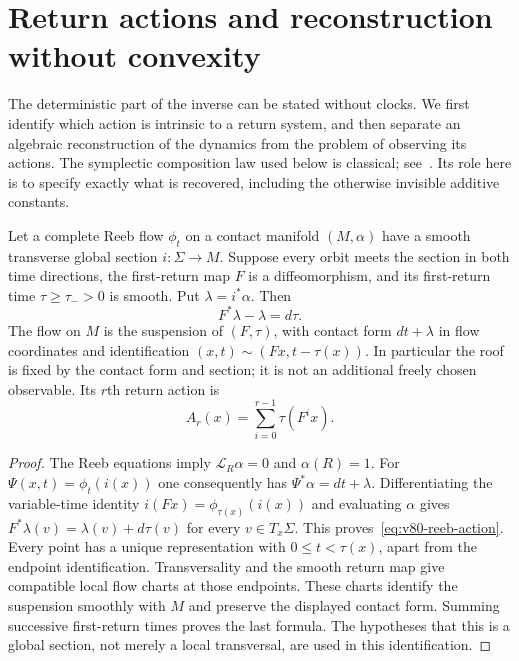\section{Return actions and reconstruction without convexity}
\label{sec:v80-intrinsic}

The deterministic part of the inverse can be stated without clocks.
We first identify which action is intrinsic to a return system, and then
separate an algebraic reconstruction of the dynamics from the problem
of observing its actions.  The symplectic composition law used below is
classical; see~\cite{MarsdenWest2001,LallWest2006}.  Its role here is to
specify exactly what is recovered, including the otherwise invisible
additive constants.

\begin{proposition}
\label{prop:v80-reeb}
Let a complete Reeb flow $\phi_t$ on a contact manifold $(M,\alpha)$
have a smooth transverse global section $i:\Sigma\to M$.  Suppose every
orbit meets the section in both time directions, the first-return map
$F$ is a diffeomorphism, and its first-return time $\tau\ge\tau_->0$ is smooth.
Put $\lambda=i^*\alpha$.  Then
\begin{equation}\label{eq:v80-reeb-action}
                       F^*\lambda-\lambda=d\tau.
\end{equation}
The flow on $M$ is the suspension of $(F,\tau)$, with contact form
$dt+\lambda$ in flow coordinates and identification
$(x,t)\sim(Fx,t-\tau(x))$.  In particular the roof is fixed by the
contact form and section; it is not an additional freely chosen
observable.  Its $r$th return action is
\[
                 A_r(x)=\sum_{i=0}^{r-1}\tau(F^i x).
\]
\end{proposition}
\begin{proof}
The Reeb equations imply $\mathcal L_R\alpha=0$ and $\alpha(R)=1$.
For $\Psi(x,t)=\phi_t(i(x))$ one consequently has
$\Psi^*\alpha=dt+\lambda$.  Differentiating the variable-time identity
$i(Fx)=\phi_{\tau(x)}(i(x))$ and evaluating $\alpha$ gives
$F^*\lambda(v)=\lambda(v)+d\tau(v)$ for every $v\in T_x\Sigma$.
This proves~\eqref{eq:v80-reeb-action}.
Every point has a unique representation with $0\le t<\tau(x)$,
apart from the endpoint identification.  Transversality and the smooth
return map give compatible local flow charts at those endpoints.  These
charts identify the suspension smoothly with $M$ and preserve the displayed
contact form.  Summing successive first-return times proves the last
formula.  The hypotheses that this is a global section, not merely a
local transversal, are used in this identification.
\end{proof}

